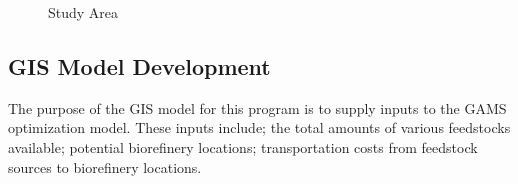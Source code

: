 \documentclass{elsart}
\begin{document}
\begin{figure}[hpt]
  \centering
  \label{fig:study-area}  
  \caption{Study Area}
\end{figure}


\subsection{\ac{GIS} Model Development}
\label{sec:gis}

The purpose of the \ac{GIS} model for this program is to supply inputs
to the \ac{GAMS} optimization model.  These inputs include; the total
amounts of various feedstocks available; potential biorefinery
locations; transportation costs from feedstock sources to biorefinery
locations.

\end{document}
